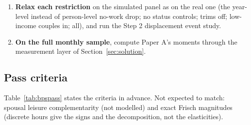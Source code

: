 \documentclass[11pt]{article}
\newcommand{\code}[1]{\texttt{#1}}
\newcommand{\1}{\mathbf{1}}
\begin{document}
\begin{enumerate}
  \code{tax\_rate\_estimation\_snap.do}, \code{pi\_s\_estimation.do}, \code{variance\_estimation.do},
  \code{frisch\_estimation.do}), the insurance decomposition and the Table 7 regressions, through
  \code{IGE/bps\_reconciliation/code/bps\_on\_sim.do}, which is first tested on BPS's own panel (it must reproduce the
  replication exactly).
  \item \textbf{Relax each restriction} on the simulated panel as on the real one (the year-level instead of person-level
  no-work drop; no status controls; trims off; low-income couples in; all), and run the Step 2 displacement event study.
  \item \textbf{On the full monthly sample}, compute Paper A's moments through the measurement layer of
  Section~\ref{sec:solution}.
\end{enumerate}

\subsection{Pass criteria}

Table~\ref{tab:bpspass} states the criteria in advance. Not expected to match: spousal leisure complementarity (not
modelled) and exact Frisch magnitudes (discrete hours give the signs and the decomposition, not the elasticities).
\end{document}

